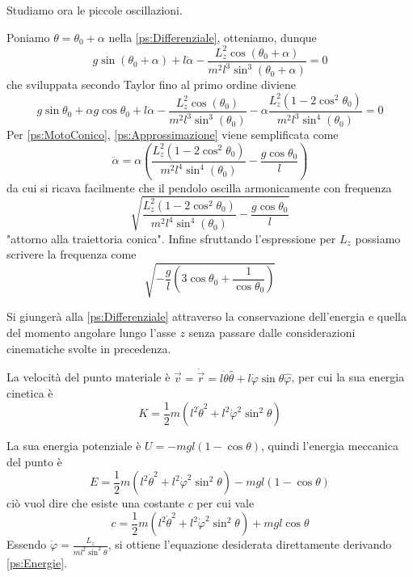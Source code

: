 \documentclass[../main.tex]{subfiles}
\begin{document}
Studiamo ora le piccole oscillazioni.

Poniamo $\theta=\theta_0+\alpha$ nella \cref{ps:Differenziale}, otteniamo, dunque
$$ g\sin(\theta_0+\alpha)+l\ddot{\alpha}-\frac{L_z^2\cos(\theta_0+\alpha)}{m^2l^3\sin^3(\theta_0+\alpha)}=0 $$
che sviluppata secondo Taylor fino al primo ordine diviene
\begin{equation}\label{ps:Approssimazione}
g\sin\theta_0+\alpha g\cos\theta_0+l\ddot{\alpha}-\frac{L_z^2\cos(\theta_0)}{m^2l^3\sin^3(\theta_0)}-\alpha\frac{L_z^2(1-2\cos^2\theta_0)}{m^2l^3\sin^4(\theta_0)}=0
\end{equation}
Per \cref{ps:MotoConico}, \cref{ps:Approssimazione} viene semplificata come
\begin{equation}
\ddot{\alpha}=\alpha\left({\frac{L_z^2(1-2\cos^2\theta_0)}{m^2l^4\sin^4(\theta_0)}-\frac{g\cos\theta_0}{l}}\right)
\end{equation}
da cui si ricava facilmente che il pendolo oscilla armonicamente con frequenza $$\sqrt{\frac{L_z^2(1-2\cos^2\theta_0)}{m^2l^4\sin^4(\theta_0)}-\frac{g\cos\theta_0}{l}}$$ "attorno alla traiettoria conica". Infine sfruttando l'espressione per $L_z$ possiamo scrivere la frequenza come
\begin{equation*}
	\sqrt{-\frac gl \left(3\cos\theta_0+\frac 1 {\cos\theta_0}\right)}
\end{equation*}

\solution[2]
Si giunger\`a alla \cref{ps:Differenziale} attraverso la conservazione dell'energia e quella del momento angolare lungo l'asse $z$ senza passare dalle considerazioni cinematiche svolte in precedenza.

La velocit\`a del punto materiale \`e $\vec{v}=\dot{\vec{r}}=l\dot{\theta}\hat{\theta}+l\dot{\varphi}\sin\theta\hat{\varphi}$, per cui la sua energia cinetica \`e
\begin{equation*}
	K=\frac 12 m(l^2\dot{\theta}^2+l^2\dot{\varphi}^2\sin^2\theta)
\end{equation*}


La sua energia potenziale \`e $U=-mgl(1-\cos\theta)$, quindi l'energia meccanica del punto \`e
\begin{equation*}
 E=\frac 12 m(l^2\dot{\theta}^2+l^2\dot{\varphi}^2\sin^2\theta)-mgl(1-\cos\theta)
\end{equation*}
ci\`o vuol dire che esiste una costante $c$ per cui vale
\begin{equation}\label{ps:Energie}
c=\frac 12 m(l^2\dot{\theta}^2+l^2\dot{\varphi}^2\sin^2\theta)+mgl\cos\theta
\end{equation}
Essendo $\displaystyle \dot{\varphi}=\frac{L_z}{ml^2\sin^2\theta}$, si ottiene l'equazione desiderata direttamente derivando \cref{ps:Energie}. 
\end{document}
